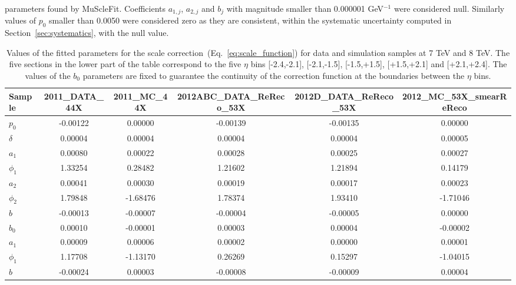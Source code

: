 parameters found by MuScleFit. 
Coefficients $a_{1,j}$, $a_{2,j}$ and $b_j$ with magnitude smaller than
0.000001 GeV$^{-1}$ were considered null. Similarly values
of $p_0$ smaller than 0.0050 were considered zero as they 
are consistent, within the systematic uncertainty 
computed in Section~\ref{sec:systematics}, with the null value.
\begin{sidewaystable}[hbH]
\begin{center}
\caption{Values of the fitted parameters for the scale
  correction~(Eq.~\ref{eq:scale_function}) for data and simulation
  samples at 7 TeV and 8 TeV. The five sections in the lower part
  of the table correspond to the five $\eta$ bins [-2.4,-2.1],
[-2.1,-1.5], [-1.5,+1.5], [+1.5,+2.1] and [+2.1,+2.4]. The values of
the $b_0$ parameters are fixed to guarantee the continuity of the
correction function at the boundaries between the $\eta$ bins.\label{tab:scale_parameters}} 
\begin{tabular}{|l|c|c|c|c|c|}
\hline
Sample & 2011\_DATA\_44X & 2011\_MC\_44X & 2012ABC\_DATA\_ReReco\_53X & 2012D\_DATA\_ReReco\_53X & 2012\_MC\_53X\_smearReReco \\
\hline
$p_0$ & -0.00122  & 0.00000  & -0.00139  & -0.00135  & 0.00000  \\
\hline
$\delta$ & 0.00004  & 0.00004  & 0.00004  & 0.00004  & 0.00005  \\
\hline
$a_1$ & 0.00080  & 0.00022  & 0.00028  & 0.00025  & 0.00027  \\
$\phi_1$ & 1.33254  & 0.28482  & 1.21602  & 1.21894  & 0.14179  \\
$a_2$ & 0.00041  & 0.00030  & 0.00019  & 0.00017  & 0.00023  \\
$\phi_2$ & 1.79848  & -1.68476  & 1.78374  & 1.93410  & -1.71046  \\
$b$ & -0.00013  & -0.00007  & -0.00004  & -0.00005  & 0.00000  \\
$b_0$ & 0.00010  & -0.00001  & 0.00003  & 0.00004  & -0.00002  \\
\hline
$a_1$ & 0.00009  & 0.00006  & 0.00002  & 0.00000  & 0.00001  \\
$\phi_1$ & 1.17708  & -1.13170  & 0.26269  & 0.15297  & -1.04015  \\
$b$ & -0.00024  & 0.00003  & -0.00008  & -0.00009  & 0.00004  \\

\end{tabular}
\end{center}
\end{sidewaystable}
